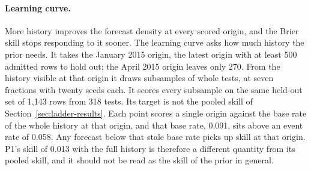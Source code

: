 \begin{table}[t]\centering\scriptsize
\caption{The assumed end of a test on the headline archive. Rows: the number of days after the creation of a test's last arm at which its end is assumed. The main run uses seven, and the other two rows come from ledgers rebuilt with 14 and 28. Columns: the tests and rows scored, the log score of P1 minus that of the base rate in nats per row, the same difference with the first scored origin (April 2013) left out, and the Brier skill of P1 against the base rate. Intervals are 90 percent bootstrap intervals by test (500 resamples), unadjusted. The column that leaves out the first origin was not planned (added after results; Appendix~\ref{sec:analysis-history}).}
\label{tab:fmt-horizon}

\end{table}

\paragraph{Learning curve.}
More history improves the forecast density at every scored origin, and the Brier skill stops responding to it sooner. The learning curve asks how much history the prior needs. It takes the January 2015 origin, the latest origin with at least 500 admitted rows to hold out; the April 2015 origin leaves only 270. From the history visible at that origin it draws subsamples of whole tests, at seven fractions with twenty seeds each. It scores every subsample on the same held-out set of 1,143 rows from 318 tests.
Its target is not the pooled skill of Section~\ref{sec:ladder-results}. Each point scores a single origin against the base rate of the whole history at that origin, and that base rate, 0.091, sits above an event rate of 0.058. Any forecast below that stale base rate picks up skill at that origin. P1's skill of 0.013 with the full history is therefore a different quantity from its pooled skill, and it should not be read as the skill of the prior in general.

